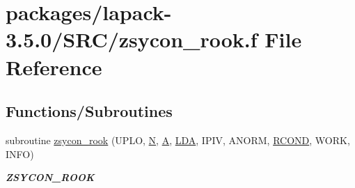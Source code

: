 \hypertarget{zsycon__rook_8f}{}\section{packages/lapack-\/3.5.0/\+S\+R\+C/zsycon\+\_\+rook.f File Reference}
\label{zsycon__rook_8f}
\subsection*{Functions/\+Subroutines}
\begin{DoxyCompactItemize}
\item 
subroutine \hyperlink{group__complex16SYcomputational_ga407f4e846976b280e1ee554dfa6657fe}{zsycon\+\_\+rook} (U\+P\+L\+O, \hyperlink{polmisc_8c_a0240ac851181b84ac374872dc5434ee4}{N}, \hyperlink{classA}{A}, \hyperlink{example__user_8c_ae946da542ce0db94dced19b2ecefd1aa}{L\+D\+A}, I\+P\+I\+V, A\+N\+O\+R\+M, \hyperlink{superlu__enum__consts_8h_af00a42ecad444bbda75cde1b64bd7e72a9b5c151728d8512307565994c89919d5}{R\+C\+O\+N\+D}, W\+O\+R\+K, I\+N\+F\+O)
\begin{DoxyCompactList}\small\item\em {\bfseries Z\+S\+Y\+C\+O\+N\+\_\+\+R\+O\+O\+K} \end{DoxyCompactList}\end{DoxyCompactItemize}
